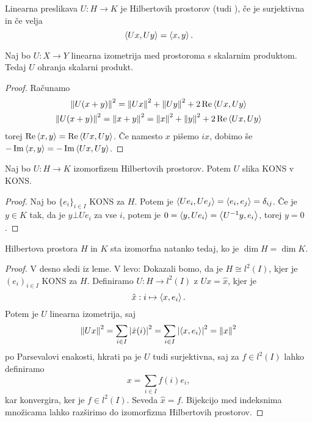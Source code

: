 
\begin{definicija}
  Linearna preslikava $U: H \to K$ je  Hilbertovih
  prostorov (tudi ), če je surjektivna in če velja
  \[
	\left< Ux, Uy \right> = \left< x,y \right>.
  \]
\end{definicija}

\begin{trditev}
  Naj bo $U: X \to Y$ linearna izometrija med prostoroma s skalarnim produktom.
  Tedaj $U$ ohranja skalarni produkt.
\end{trditev}

\begin{proof}
  Računamo
  \begin{gather*}
	\left\lVert U(x+y)\right\rVert^2 = \left\lVert Ux\right\rVert^2 + \left\lVert Uy\right\rVert^2 + 2 \operatorname{Re} \left< Ux, Uy \right> \\
	\left\lVert U(x+y)\right\rVert^2 = \left\lVert x+y\right\rVert^2 = \left\lVert x\right\rVert^2 + \left\lVert y\right\rVert^2 + 2 \operatorname{Re} \left< Ux, Uy \right>
  \end{gather*}
  torej $\operatorname{Re} \left< x,y \right> = \operatorname{Re} \left< Ux, Uy \right>$.
  Če namesto $x$ pišemo $ix$, dobimo še $- \operatorname{Im} \left< x,y \right> = - \operatorname{Im} \left< Ux,
	Uy \right>$.
\end{proof}


\begin{lema}
  Naj bo $U: H \to K$ izomorfizem Hilbertovih prostorov.
  Potem $U$ slika KONS v KONS.
\end{lema}

\begin{proof}
  Naj bo $\{e_i\}_{i \in I}$ KONS za $H$.
  Potem je $\left< Ue_i, U e_j \right> = \left< e_i, e_j \right> = \delta_{ij}$.
  Če je $y \in K$ tak, da je $y \bot U e_i$ za vse $i$, potem je $0 = \left< y, U
	e_i \right> = \left< U^{-1} y, e_i \right>$, torej $y = 0$.
\end{proof}

\begin{izrek}
  Hilbertova prostora $H$ in $K$ sta izomorfna natanko tedaj, ko je $\dim H =
  \dim K$.
\end{izrek}

\begin{proof}
  V desno sledi iz leme.
  V levo:
  Dokazali bomo, da je $H \cong l^2(I)$, kjer je $(e_i)_{i \in I}$ KONS za $H$.
  Definiramo $U: H \to l^2(I)$ z $Ux = \hat{x}$, kjer je
  \[
	\hat{x}: i \mapsto \left< x, e_i \right>.
  \]
  Potem je $U$ linearna izometrija, saj
  \[
	\left\lVert Ux\right\rVert^2 = \sum_{i \in I} \left| \hat{x}(i) \right|^2 = \sum_{i \in I} \left| \left< x,
	  e_i \right> \right|^2 = \left\lVert x\right\rVert^2
  \]
  po Parsevalovi enakosti, hkrati pa je $U$ tudi surjektivna, saj za $f \in
  l^2(I)$ lahko definiramo
  \[
	x = \sum_{i \in I} f(i) e_i,
  \]
  kar konvergira, ker je $f \in l^2(I)$.
  Seveda $\hat{x} = f$.
  Bijekcijo med indeksnima množicama lahko razširimo do izomorfizma Hilbertovih
  prostorov.
\end{proof}

